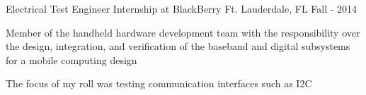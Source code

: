 \begin{cventries}
	\cventry
		{Electrical Test Engineer} %
		{Internship at BlackBerry} %
		{Ft. Lauderdale, FL} %
		{Fall - 2014} %
		{
			\begin{cvitems} %
			\item {Member of the handheld hardware development team with the responsibility over the design, integration, and verification of the baseband and digital subsystems for a mobile computing design}
			\item {The focus of my roll was testing communication interfaces such as I2C}
			\end{cvitems}
		}
\end{cventries}
